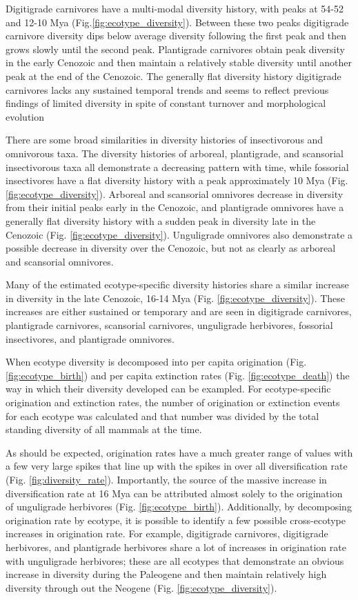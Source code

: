 \documentclass[12pt,letterpaper]{article}
\begin{document}
Digitigrade carnivores have a multi-modal diversity history, with peaks at 54-52 and 12-10 Mya (Fig.\ref{fig:ecotype_diversity}). Between these two peaks digitigrade carnivore diversity dips below average diversity following the first peak and then grows slowly until the second peak. Plantigrade carnivores obtain peak diversity in the early Cenozoic and then maintain a relatively stable diversity until another peak at the end of the Cenozoic. The generally flat diversity history digitigrade carnivores lacks any sustained temporal trends and seems to reflect previous findings of limited diversity in spite of constant turnover and morphological evolution \citep{Valkenburgh1999,Silvestro2015b,Slater2015c}

There are some broad similarities in diversity histories of insectivorous and omnivorous taxa. The diversity histories of arboreal, plantigrade, and scansorial insectivorous taxa all demonstrate a decreasing pattern with time, while fossorial insectivores have a flat diversity history with a peak approximately 10 Mya (Fig. \ref{fig:ecotype_diversity}). Arboreal and scansorial omnivores decrease in diversity from their initial peaks early in the Cenozoic, and plantigrade omnivores have a generally flat diversity history with a sudden peak in diversity late in the Cenozoic (Fig. \ref{fig:ecotype_diversity}). Unguligrade omnivores also demonstrate a possible decrease in diversity over the Cenozoic, but not as clearly as arboreal and scansorial omnivores.

Many of the estimated ecotype-specific diversity histories share a similar increase in diversity in the late Cenozoic, 16-14 Mya (Fig. \ref{fig:ecotype_diversity}). These increases are either sustained or temporary and are seen in digitigrade carnivores, plantigrade carnivores, scansorial carnivores, unguligrade herbivores, fossorial insectivores, and plantigrade omnivores.

When ecotype diversity is decomposed into per capita origination (Fig. \ref{fig:ecotype_birth}) and per capita extinction rates (Fig. \ref{fig:ecotype_death}) the way in which their diversity developed can be exampled. For ecotype-specific origination and extinction rates, the number of origination or extinction events for each ecotype was calculated and that number was divided by the total standing diversity of all mammals at the time. 

As should be expected, origination rates have a much greater range of values with a few very large spikes that line up with the spikes in over all diversification rate (Fig. \ref{fig:diversity_rate}). Importantly, the source of the massive increase in diversification rate at 16 Mya can be attributed almost solely to the origination of unguligrade herbivores (Fig. \ref{fig:ecotype_birth}). Additionally, by decomposing origination rate by ecotype, it is possible to identify a few possible cross-ecotype increases in origination rate. For example, digitigrade carnivores, digitigrade herbivores, and plantigrade herbivores share a lot of increases in origination rate with unguligrade herbivores; these are all ecotypes that demonstrate an obvious increase in diversity during the Paleogene and then maintain relatively high diversity through out the Neogene (Fig. \ref{fig:ecotype_diversity}).
\end{document}
